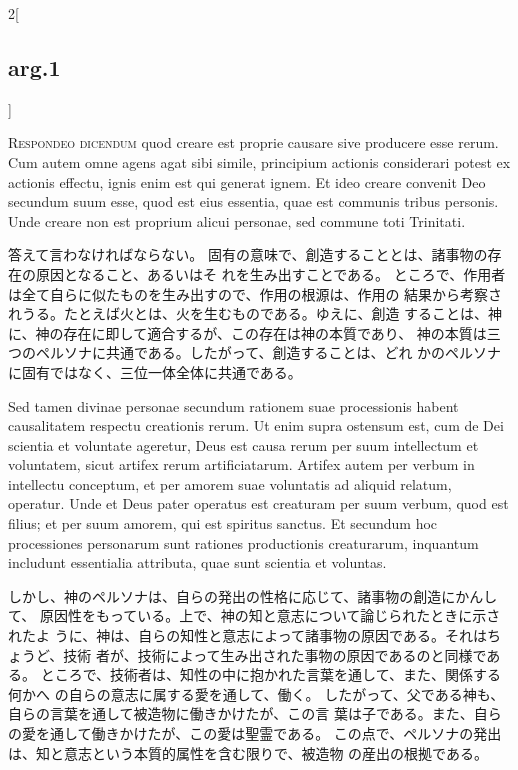 \documentclass[paper=a4paper,fontsize=10pt,jafontsize=9pt,titlepage]{jlreq}
\begin{document}
\begin{paracol}{2}[\subsection{arg.1}]

{\scshape Respondeo dicendum} quod creare est proprie
causare sive producere esse rerum. Cum autem omne agens agat sibi
simile, principium actionis considerari potest ex actionis effectu,
ignis enim est qui generat ignem. Et ideo creare convenit Deo secundum
suum esse, quod est eius essentia, quae est communis tribus
personis. Unde creare non est proprium alicui personae, sed commune toti
Trinitati.

\switchcolumn

答えて言わなければならない。
固有の意味で、創造することとは、諸事物の存在の原因となること、あるいはそ
 れを生み出すことである。
ところで、作用者は全て自らに似たものを生み出すので、作用の根源は、作用の
 結果から考察されうる。たとえば火とは、火を生むものである。ゆえに、創造
 することは、神に、神の存在に即して適合するが、この存在は神の本質であり、
 神の本質は三つのペルソナに共通である。したがって、創造することは、どれ
 かのペルソナに固有ではなく、三位一体全体に共通である。

\switchcolumn*

Sed tamen divinae personae secundum rationem suae
processionis habent causalitatem respectu creationis rerum. Ut enim
supra ostensum est, cum de Dei scientia et voluntate ageretur, Deus est
causa rerum per suum intellectum et voluntatem, sicut artifex rerum
artificiatarum. Artifex autem per verbum in intellectu conceptum, et per
amorem suae voluntatis ad aliquid relatum, operatur. Unde et Deus pater
operatus est creaturam per suum verbum, quod est filius; et per suum
amorem, qui est spiritus sanctus. Et secundum hoc processiones
personarum sunt rationes productionis creaturarum, inquantum includunt
essentialia attributa, quae sunt scientia et voluntas.

\switchcolumn

しかし、神のペルソナは、自らの発出の性格に応じて、諸事物の創造にかんして、
 原因性をもっている。上で、神の知と意志について論じられたときに示されたよ
 うに、神は、自らの知性と意志によって諸事物の原因である。それはちょうど、技術
 者が、技術によって生み出された事物の原因であるのと同様である。
ところで、技術者は、知性の中に抱かれた言葉を通して、また、関係する何かへ
 の自らの意志に属する愛を通して、働く。
したがって、父である神も、自らの言葉を通して被造物に働きかけたが、この言
 葉は子である。また、自らの愛を通して働きかけたが、この愛は聖霊である。
この点で、ペルソナの発出は、知と意志という本質的属性を含む限りで、被造物
 の産出の根拠である。


\end{paracol}
\end{document}
